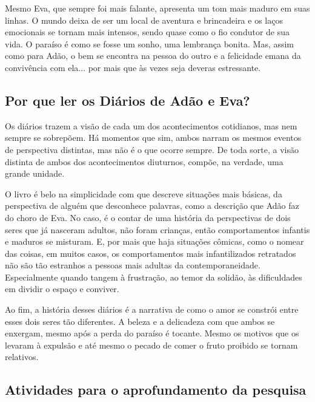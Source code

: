 \documentclass[12pt]{extarticle}
\begin{document}
Mesmo Eva, que sempre foi mais falante, apresenta um tom mais maduro em
suas linhas. O mundo deixa de ser um local de aventura e brincadeira e
os laços emocionais se tornam mais intensos, sendo quase como o fio
condutor de sua vida. O paraíso é como se fosse um sonho, uma lembrança
bonita. Mas, assim como para Adão, o bem se encontra na pessoa do outro
e a felicidade emana da convivência com ela... por mais que às vezes
seja deveras estressante.

\subsection{Por que ler os Diários de Adão e Eva?}

Os diários trazem a visão de cada um dos acontecimentos cotidianos, mas
nem sempre se sobrepõem. Há momentos que sim, ambos narram os mesmos
eventos de perspectiva distintas, mas não é o que ocorre sempre. De toda
sorte, a visão distinta de ambos dos acontecimentos diuturnos, compõe,
na verdade, uma grande unidade.

O livro é belo na simplicidade com que descreve situações mais básicas,
da perspectiva de alguém que desconhece palavras, como a descrição que
Adão faz do choro de Eva. No caso, é o contar de uma história da
perspectivas de dois seres que já nasceram adultos, não foram crianças,
então comportamentos infantis e maduros se misturam. E, por mais que
haja situações cômicas, como o nomear das coisas, em muitos casos, os
comportamentos mais infantilizados retratados não são tão estranhos a
pessoas mais adultas da contemporaneidade. Especialmente quando tangem à
frustração, ao temor da solidão, às dificuldades em dividir o espaço e
conviver.

Ao fim, a história desses diários é a narrativa de como o amor se
constrói entre esses dois seres tão diferentes. A beleza e a delicadeza
com que ambos se enxergam, mesmo após a perda do paraíso é tocante.
Mesmo os motivos que os levaram à expulsão e até mesmo o pecado de comer
o fruto proibido se tornam relativos.


\subsection{Atividades para o aprofundamento da pesquisa}

\end{document}
